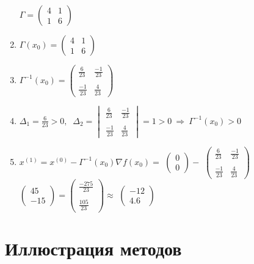 \documentclass{article}
\begin{document}
\begin{enumerate}
        $\Gamma = \begin{pmatrix} 4 & 1 \\ 1 & 6 \end{pmatrix}$
    \item $\Gamma(x_0) = \begin{pmatrix} 4 & 1 \\ 1 & 6 \end{pmatrix}$
    \item $\Gamma^{-1}(x_0) = \begin{pmatrix} \frac{6}{23} & \frac{-1}{23} \\\\ \frac{-1}{23} & \frac{4}{23} \end{pmatrix}$
    \item $\Delta_1 = \frac{6}{23} > 0, \ $ 
        $\Delta_2 = \begin{vmatrix} \frac{6}{23} & \frac{-1}{23} \\\\ \frac{-1}{23} & \frac{4}{23} \end{vmatrix} = 1 > 0 \ \Rightarrow \ \Gamma^{-1}(x_0) > 0$
    \item $x^{(1)} = x^{(0)} - \Gamma^{-1}(x_0) \nabla f(x_0) = $
        $\begin{pmatrix} 0 \\ 0 \end{pmatrix} - $
        $\begin{pmatrix} \frac{6}{23} & \frac{-1}{23} \\\\ \frac{-1}{23} & \frac{4}{23} \end{pmatrix}$
        $\begin{pmatrix} 45 \\ -15 \end{pmatrix} = \begin{pmatrix} \frac{-275}{23} \\\\ \frac{105}{23} \end{pmatrix} \approx$
        $\begin{pmatrix} -12 \\ 4.6 \end{pmatrix}$

\end{enumerate}

\pagebreak

\section{Иллюстрация методов}
\end{document}
